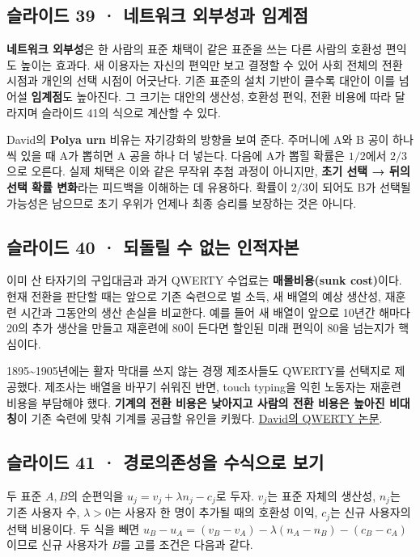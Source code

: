 \documentclass[10pt,a4paper]{article}
\begin{document}
\subsection{슬라이드 39 · 네트워크 외부성과 임계점}
\textbf{네트워크 외부성}은 한 사람의 표준 채택이 같은 표준을 쓰는 다른 사람의 호환성 편익도 높이는 효과다. 새 이용자는 자신의 편익만 보고 결정할 수 있어 사회 전체의 전환 시점과 개인의 선택 시점이 어긋난다. 기존 표준의 설치 기반이 클수록 대안이 이를 넘어설 \textbf{임계점}도 높아진다. 그 크기는 대안의 생산성, 호환성 편익, 전환 비용에 따라 달라지며 슬라이드 41의 식으로 계산할 수 있다.\par

David의 \textbf{Polya urn} 비유는 자기강화의 방향을 보여 준다. 주머니에 A와 B 공이 하나씩 있을 때 A가 뽑히면 A 공을 하나 더 넣는다. 다음에 A가 뽑힐 확률은 $1/2$에서 $2/3$으로 오른다. 실제 채택은 이와 같은 무작위 추첨 과정이 아니지만, \textbf{초기 선택 → 뒤의 선택 확률 변화}라는 피드백을 이해하는 데 유용하다. 확률이 $2/3$이 되어도 B가 선택될 가능성은 남으므로 초기 우위가 언제나 최종 승리를 보장하는 것은 아니다.\par

\subsection{슬라이드 40 · 되돌릴 수 없는 인적자본}
이미 산 타자기의 구입대금과 과거 QWERTY 수업료는 \textbf{매몰비용(sunk cost)}이다. 현재 전환을 판단할 때는 앞으로 기존 숙련으로 벌 소득, 새 배열의 예상 생산성, 재훈련 시간과 그동안의 생산 손실을 비교한다. 예를 들어 새 배열이 앞으로 10년간 해마다 20의 추가 생산을 만들고 재훈련에 80이 든다면 할인된 미래 편익이 80을 넘는지가 핵심이다.\par

1895\textasciitilde{}1905년에는 활자 막대를 쓰지 않는 경쟁 제조사들도 QWERTY를 선택지로 제공했다. 제조사는 배열을 바꾸기 쉬워진 반면, touch typing을 익힌 노동자는 재훈련 비용을 부담해야 했다. \textbf{기계의 전환 비용은 낮아지고 사람의 전환 비용은 높아진 비대칭}이 기존 숙련에 맞춰 기계를 공급할 유인을 키웠다. \href{https://www.jstor.org/stable/1805621}{David의 QWERTY 논문}.\par

\subsection{슬라이드 41 · 경로의존성을 수식으로 보기}
두 표준 $A,B$의 순편익을 $u_j=v_j+\lambda n_j-c_j$로 두자. $v_j$는 표준 자체의 생산성, $n_j$는 기존 사용자 수, $\lambda>0$는 사용자 한 명이 추가될 때의 호환성 이익, $c_j$는 신규 사용자의 선택 비용이다. 두 식을 빼면 $u_B-u_A=(v_B-v_A)-\lambda(n_A-n_B)-(c_B-c_A)$이므로 신규 사용자가 $B$를 고를 조건은 다음과 같다.\par
\end{document}
